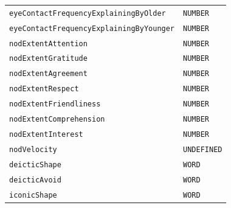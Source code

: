 \documentclass{CSSRforAfrica}
\begin{document}
\begin{table}[H]
\begin{tabular}{l l}
{\footnotesize \verb+eyeContactFrequencyExplainingByOlder+} 	    & {\footnotesize \verb+NUMBER+} \vspace{-1.5mm} \\
{\footnotesize \verb+eyeContactFrequencyExplainingByYounger+}   & {\footnotesize \verb+NUMBER+} \vspace{-1.5mm} \\
{\footnotesize \verb+nodExtentAttention+} 	                                   & {\footnotesize \verb+NUMBER+ }\vspace{-1.5mm} \\
{\footnotesize \verb+nodExtentGratitude+} 	                                   & {\footnotesize \verb+NUMBER+ }\vspace{-1.5mm} \\
{\footnotesize \verb+nodExtentAgreement+} 	                           & {\footnotesize \verb+NUMBER+ }\vspace{-1.5mm} \\
{\footnotesize \verb+nodExtentRespect+} 	                                   & {\footnotesize \verb+NUMBER+ }\vspace{-1.5mm} \\
{\footnotesize \verb+nodExtentFriendliness+} 	                           & {\footnotesize \verb+NUMBER+ }\vspace{-1.5mm} \\
{\footnotesize \verb+nodExtentComprehension+}                           & {\footnotesize \verb+NUMBER+ }\vspace{-1.5mm} \\
{\footnotesize \verb+nodExtentInterest+} 	                                  & {\footnotesize \verb+NUMBER+ }\vspace{-1.5mm} \\
{\footnotesize \verb+nodVelocity+} 	                                         & {\footnotesize \verb+UNDEFINED+ }\vspace{-1.5mm} \\
{\footnotesize \verb+deicticShape+} 	                                          & {\footnotesize \verb+WORD+} \vspace{-1.5mm}\\
{\footnotesize \verb+deicticAvoid+} 	                                          & {\footnotesize \verb+WORD+}  \vspace{-1.5mm}\\
{\footnotesize \verb+iconicShape+} 	                                          & {\footnotesize \verb+WORD+} \vspace{-1.5mm}\\

\end{tabular}
\end{table}
\end{document}
